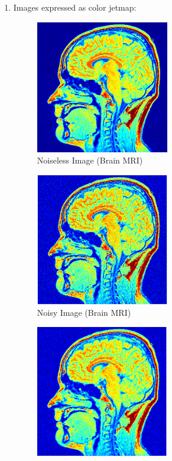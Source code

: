 \documentclass[12pt]{article}
\theoremstyle{definition}
\numberwithin{thm}{section}
\begin{document}
\begin{enumerate}[label=(\alph*)]
\begin{enumerate}[label=(\arabic*)]
\begin{enumerate}
	\end{enumerate}
\end{enumerate}\newpage
\item Images expressed as color jetmap:
	\begin{figure}[H]
		\centering
    	\includegraphics[width=0.55\textwidth]{imgs/Original_BrainMRI.png}
    	\caption{Noiseless Image (Brain MRI)}
    	\label{fig:NL2}
	\end{figure}
	\begin{figure}[H]
		\centering
    	\includegraphics[width=0.55\textwidth]{imgs/Noisy_BrainMRI.png}
    	\caption{Noisy Image (Brain MRI)}
    	\label{fig:N2}
	\end{figure}
	\begin{figure}[H]
		\centering
    	\includegraphics[width=0.55\textwidth]{imgs/Quadratic_BrainMRI.png}

\end{figure}
\end{enumerate}
\end{document}

